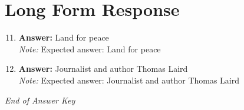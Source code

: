 \documentclass[12pt]{article}
\begin{document}
\section*{Long Form Response}
\begin{enumerate}[label=\arabic*.]
\setcounter{enumi}{10}
\item \textbf{Answer:} Land for peace
\\ \textit{Note:} Expected answer: Land for peace
\item \textbf{Answer:} Journalist and author Thomas Laird
\\ \textit{Note:} Expected answer: Journalist and author Thomas Laird
\end{enumerate}

\vfill
\noindent\textit{End of Answer Key}
\end{document}
